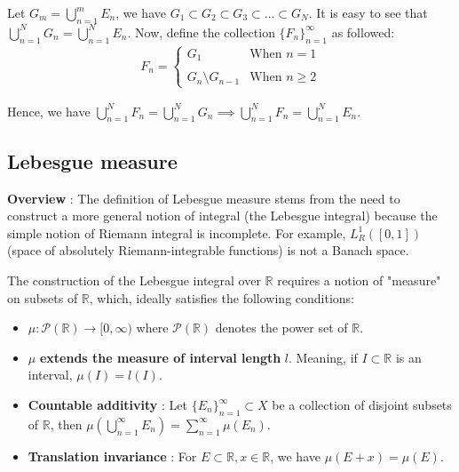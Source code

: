 \begin{proof*}
    Let $G_m = \bigcup_{n=1}^m E_n$, we have $G_1 \subset G_2 \subset G_3 \subset \dots \subset G_N$. It is easy to see that $\bigcup_{n=1}^N G_n = \bigcup_{n=1}^N E_n$. Now, define the collection $\{F_n\}_{n=1}^\infty$ as followed:
    \begin{align*}
        F_n = 
        \begin{cases}
            G_1 & \text{When } n = 1
            \\ \\
            G_{n} \setminus G_{n-1} & \text{When } n \ge 2
        \end{cases}
    \end{align*}

    \noindent Hence, we have $\bigcup_{n=1}^N F_n = \bigcup_{n=1}^N G_n \implies \bigcup_{n=1}^NF_n = \bigcup_{n=1}^N E_n$.
\end{proof*}

\subsection{Lebesgue measure}
\noindent \textbf{Overview} : The definition of Lebesgue measure stems from the need to construct a more general notion of integral (the Lebesgue integral) because the simple notion of Riemann integral is incomplete. For example, $L^1_R([0,1])$ (space of absolutely Riemann-integrable functions) is not a Banach space.

\noindent\newline The construction of the Lebesgue integral over $\mathbb{R}$ requires a notion of "measure" on subsets of $\mathbb{R}$, which, ideally satisfies the following conditions:
\begin{itemize}
    \item $\mu:\mathcal{P}(\mathbb{R}) \to [0, \infty)$ where $\mathcal{P}(\mathbb{R})$ denotes the power set of $\mathbb{R}$.
    \item $\mu$ \textbf{extends the measure of interval length} $l$. Meaning, if $I\subset \mathbb{R}$ is an interval, $\mu(I)=l(I)$.
    \item \textbf{Countable additivity} : Let $\{E_n\}_{n=1}^\infty\subset X$ be a collection of disjoint subsets of $\mathbb{R}$, then $\mu(\bigcup_{n=1}^\infty E_n) = \sum_{n=1}^\infty \mu(E_n)$.
    \item \textbf{Translation invariance} : For $E \subset \mathbb{R}, x\in \mathbb{R}$, we have $\mu(E+x)=\mu(E)$.
\end{itemize}

